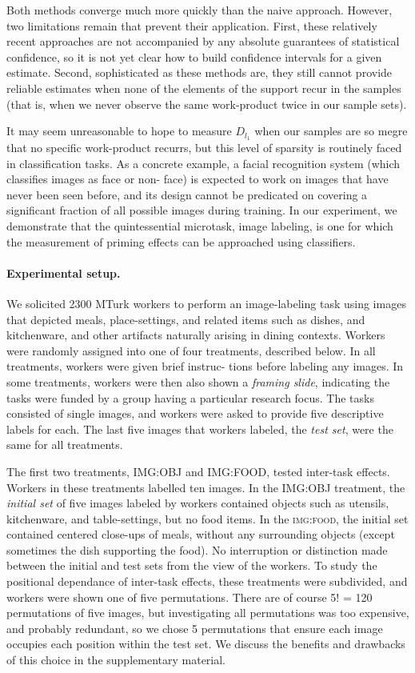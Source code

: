 \documentclass[12pt]{article}
\begin{document}
Both methods converge much more quickly than the naive approach. However, two 
limitations remain that prevent their application. First, these relatively 
recent approaches are not accompanied by any absolute guarantees of 
statistical confidence, so it is not yet clear how to build confidence 
intervals for a given estimate. Second, sophisticated as these methods are, 
they still cannot provide reliable estimates when none of the elements of the 
support recur in the samples (that is, when we never observe the same 
work-product twice in our sample sets).

It may seem unreasonable to hope to measure $D_{l_1}$ when our samples are so 
megre that no specific work-product recurrs, but this level of sparsity is 
routinely faced in classification tasks. As a concrete example, a facial 
recognition 
system (which classifies images as face or non- face) is expected to work on 
images that have never been seen before, and its design cannot be predicated on
covering a significant fraction of all possible images during training. In our 
experiment, we demonstrate that the quintessential microtask, image labeling, 
is one for which the measurement of priming effects can be approached using 
classifiers.

\paragraph{Experimental setup.}
We solicited 2300 MTurk workers to perform an image-labeling task using images 
that depicted meals, place-settings, and related items such as dishes, and 
kitchenware, and other artifacts naturally arising in dining contexts. Workers 
were randomly assigned into one of four treatments, described below. In all 
treatments, workers were given brief instruc- tions before labeling any images.
In some treatments, workers were then also shown a \textit{framing slide}, 
indicating 
the tasks were funded by a group having a particular research focus. The tasks 
consisted of single images, and workers were asked to provide five descriptive 
labels for each. The last five images that workers labeled, the 
\textit{test set}, were the same for all treatments.

The first two treatments, IMG:OBJ and IMG:FOOD, tested inter-task effects. 
Workers in these treatments labelled ten images. In the IMG:OBJ treatment, the 
\textit{initial set} of five images labeled by workers contained objects such 
as utensils, kitchenware, and table-settings, but no food items. In the 
\textsc{img:food}, the initial set contained centered close-ups of meals, 
without
any surrounding objects (except sometimes the dish supporting the food). No 
interruption or distinction made between the initial and test sets from the 
view of the workers. To study the positional dependance of inter-task effects,
these treatments were subdivided, and workers were shown one of five 
permutations. There are of course 5! = 120 permutations of five images, but 
investigating all permutations was too expensive, and probably redundant, so 
we chose 5 permutations that ensure each image occupies each position within 
the test set. We discuss the benefits and drawbacks of this choice in the 
supplementary material.
\end{document}
